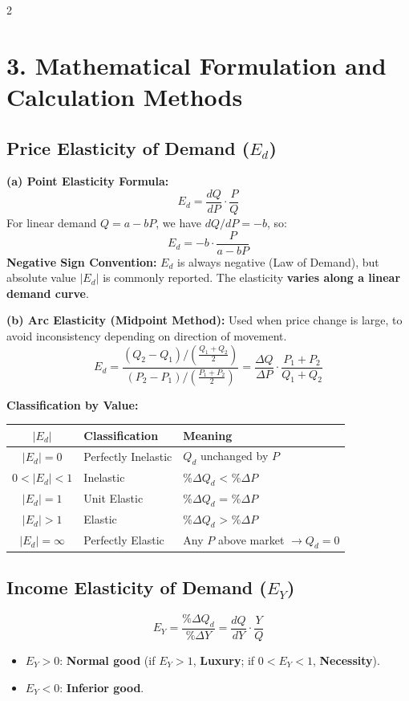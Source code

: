 \documentclass[10pt,a4paper]{article}
\begin{document}
\begin{multicols}{2}
\section*{3. Mathematical Formulation and Calculation Methods}

\subsection*{Price Elasticity of Demand ($E_d$)}
\textbf{(a) Point Elasticity Formula:}
\[
E_d = \frac{dQ}{dP} \cdot \frac{P}{Q}
\]
For linear demand $Q = a - bP$, we have $dQ/dP = -b$, so:
\[
E_d = -b \cdot \frac{P}{a - bP}
\]
\textbf{Negative Sign Convention:} $E_d$ is always negative (Law of Demand), but absolute value $|E_d|$ is commonly reported. The elasticity \textbf{varies along a linear demand curve}.

\textbf{(b) Arc Elasticity (Midpoint Method):} Used when price change is large, to avoid inconsistency depending on direction of movement.
\[
E_d = \frac{(Q_2 - Q_1) / \left(\frac{Q_1 + Q_2}{2}\right)}{(P_2 - P_1) / \left(\frac{P_1 + P_2}{2}\right)} = \frac{\Delta Q}{\Delta P} \cdot \frac{P_1 + P_2}{Q_1 + Q_2}
\]

\textbf{Classification by Value:}
\begin{center}
\begin{tabular}{@{}cll@{}}
\toprule
\textbf{$|E_d|$} & \textbf{Classification} & \textbf{Meaning} \\
\midrule
$|E_d| = 0$ & Perfectly Inelastic & $Q_d$ unchanged by $P$ \\
$0 < |E_d| < 1$ & Inelastic & \%$\Delta Q_d$ < \%$\Delta P$ \\
$|E_d| = 1$ & Unit Elastic & \%$\Delta Q_d$ = \%$\Delta P$ \\
$|E_d| > 1$ & Elastic & \%$\Delta Q_d$ > \%$\Delta P$ \\
$|E_d| = \infty$ & Perfectly Elastic & Any $P$ above market $\to Q_d = 0$ \\
\bottomrule
\end{tabular}
\end{center}

\subsection*{Income Elasticity of Demand ($E_Y$)}
\[
E_Y = \frac{\%\Delta Q_d}{\%\Delta Y} = \frac{dQ}{dY} \cdot \frac{Y}{Q}
\]
\begin{itemize}[leftmargin=*,nosep]
    \item $E_Y > 0$: \textbf{Normal good} (if $E_Y > 1$, \textbf{Luxury}; if $0 < E_Y < 1$, \textbf{Necessity}).
    \item $E_Y < 0$: \textbf{Inferior good}.
\end{itemize}


\end{multicols}
\end{document}
